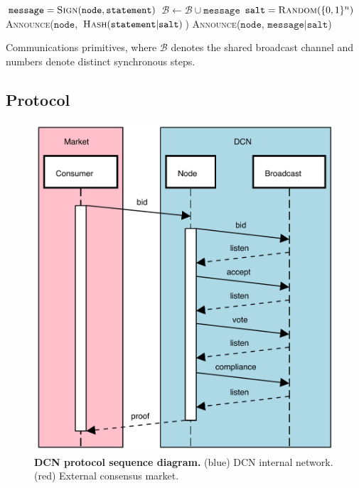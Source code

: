 
\begin{algorithm}[H]
	\begin{algorithmic}
		\State $\mathtt{message} = \textsc{Sign}(\mathtt{node}, \mathtt{statement})$
		\State $\mathcal{B} \gets \mathcal{B} \cup \mathtt{message}$ 
		\EndFunction
		\State
		\State $\mathtt{salt} = \textsc{Random}(\{0,1\}^n)$
		\State {}
		\State \textsc{Announce}($\mathtt{node}$, $\textsc{Hash}(\mathtt{statement}|\mathtt{salt})$)
		\State {}
		\State \textsc{Announce}($\mathtt{node}$, $\mathtt{message}|\mathtt{salt}$)
		\EndFunction
	\end{algorithmic}
	\caption{Communications primitives, where $\mathcal{B}$ denotes the shared broadcast channel and numbers denote distinct synchronous steps.} \label{alg:comms_primitive}
\end{algorithm}

\subsection{Protocol}

\begin{figure}[!htb]
	\includegraphics[width=\columnwidth]{figures/sequence_diagram.pdf}
	\caption{\textbf{DCN protocol sequence diagram.} (blue) DCN internal network. (red) External consensus market.} \label{fig:sequence_diagram}
\end{figure}

